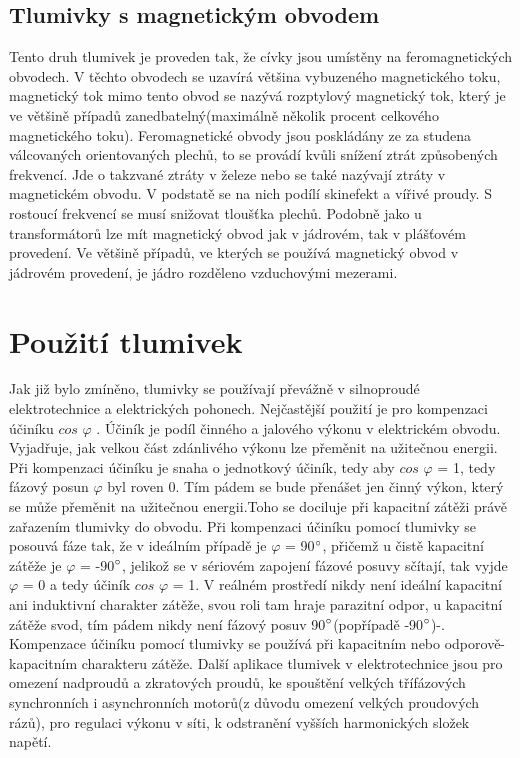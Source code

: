 \subsection{Tlumivky s magnetickým obvodem}
Tento druh tlumivek je proveden tak, že cívky jsou umístěny na feromagnetických obvodech. V těchto obvodech se uzavírá většina vybuzeného magnetického toku, magnetický tok mimo tento obvod se nazývá rozptylový magnetický tok, který je ve většině případů zanedbatelný(maximálně několik procent celkového magnetického toku). Feromagnetické obvody jsou poskládány ze za studena válcovaných orientovaných plechů, to se provádí kvůli snížení ztrát způsobených frekvencí. Jde o takzvané ztráty v železe nebo se také nazývají ztráty v magnetickém obvodu. V podstatě se na nich podílí skinefekt a vířivé proudy. S rostoucí frekvencí se musí snižovat tloušťka plechů. Podobně jako u transformátorů lze mít magnetický obvod jak v jádrovém, tak v plášťovém provedení. Ve většině případů, ve kterých se používá magnetický obvod v jádrovém provedení, je jádro rozděleno vzduchovými mezerami.

\section{Použití tlumivek}
Jak již bylo zmíněno, tlumivky se používají převážně v silnoproudé elektrotechnice a elektrických pohonech. Nejčastější použití je pro kompenzaci účiníku $cos$ $\varphi$ .
Účiník je podíl činného a jalového výkonu v elektrickém obvodu. Vyjadřuje, jak velkou část zdánlivého výkonu lze přeměnit na užitečnou energii. Při kompenzaci účiníku je snaha o jednotkový účiník, tedy aby $cos$ $\varphi$ = 1, tedy fázový posun $\varphi$ byl roven 0. Tím pádem se bude přenášet jen činný výkon, který se může přeměnit na užitečnou energii.Toho se dociluje při kapacitní zátěži právě zařazením tlumivky do obvodu. Při kompenzaci účiníku pomocí tlumivky se posouvá fáze tak, že v ideálním případě je $\varphi$ = 90$^{\circ}$, přičemž u čistě kapacitní zátěže je $\varphi$ = -90$^{\circ}$, jelikož se v sériovém zapojení fázové posuvy sčítají, tak vyjde $\varphi$ = 0 a tedy účiník $ cos$ $\varphi$ = 1. V reálném prostředí nikdy není ideální kapacitní ani induktivní charakter zátěže, svou roli tam hraje parazitní odpor, u kapacitní zátěže svod, tím pádem nikdy není fázový posuv 90$^{\circ}$(popřípadě -90$^{\circ}$)-. Kompenzace účiníku pomocí tlumivky se používá při kapacitním nebo odporově-kapacitním charakteru zátěže. 
Další aplikace tlumivek v elektrotechnice jsou pro omezení nadproudů a zkratových proudů, ke spouštění velkých třífázových synchronních i asynchronních motorů(z důvodu omezení velkých proudových rázů), pro regulaci výkonu v síti, k odstranění vyšších harmonických složek napětí.

